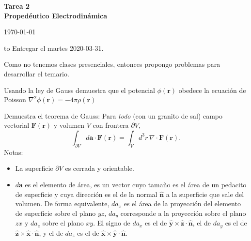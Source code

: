 \documentclass{exam}
\begin{document}
\begin{center}
\bf\large Tarea 2\\
Propedéutico Electrodinámica\\
\date{2020-03-10}
\today\\[20pt]
\end{center}
\hbox to \textwidth{Nombre: \enspace\hrulefill}
Entregar el martes 2020-03-31.

Como no tenemos clases presenciales, entonces propongo problemas para
desarrollar el temario.

\begin{questions}
  \question Usando la ley de Gauss demuestra que el potencial
  $\phi(\bm r)$ obedece la ecuación de Poisson $\nabla^2\phi(\bm
  r)=-4\pi\rho(\bm r)$

  \question Demuestra el teorema de Gauss: Para {\em todo} (con un
  granito de sal) campo vectorial $\bm F(\bm r)$ y volumen $V$
  con frontera $\partial V$,
  $$
  \int_{\partial V}d\bm a\cdot\bm F(\bm r)=\int_V d^3 r\, \nabla\cdot\bm
  F(\bm r).
  $$
  Notas:
  \begin{itemize}
  \item La superficie $\partial V$ es cerrada y orientable.
  \item $d\bm a$ es el elemento de área, es un vector cuyo tamaño es
    el área de un pedacito de superficie y cuya dirección es el de la
    normal $\hat {\bm n}$ a
    la superficie que sale del volumen. De forma equivalente, $da_x$
    es el área de la proyección del elemento de
    superficie sobre el plano $yz$, $da_y$ corresponde a la proyección
    sobre el plano $zx$ y $da_z$ sobre el plano $xy$. El signo de
    $da_x$ es el de $\hat{\bm  y}\times\hat{\bm z}\cdot\hat{\bm  n}$,
    el de $da_y$ es el de $\hat{\bm  z}\times\hat {\bm x}\cdot\hat{\bm
      n}$,
    y el de $da_z$ es el de $\hat{\bm  x}\times\hat{\bm  y}\cdot\hat{\bm n}$.
  \end{itemize}


\end{questions}
\end{document}
